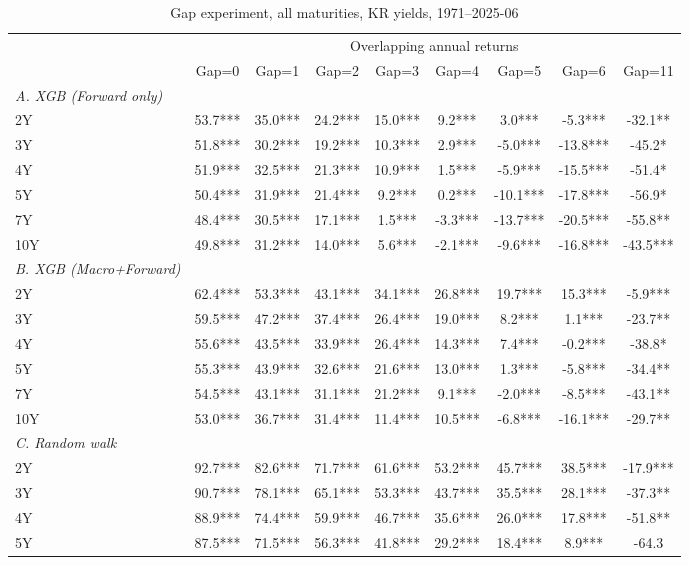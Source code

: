 \begin{table}[ht]
\centering
\small
\caption{Gap experiment, all maturities, KR yields, 1971–2025-06}
\label{tab:gap_all_maturities}
\begin{tabular}{lcccccccc}
\toprule
 & \multicolumn{8}{c}{Overlapping annual returns} \\
\cmidrule(lr){2-9}
 & Gap=0 & Gap=1 & Gap=2 & Gap=3 & Gap=4 & Gap=5 & Gap=6 & Gap=11 \\
\midrule
\textit{A. XGB (Forward only)} \\
2Y & 53.7*** & 35.0*** & 24.2*** & 15.0*** & 9.2*** & 3.0*** & -5.3*** & -32.1** \\
3Y & 51.8*** & 30.2*** & 19.2*** & 10.3*** & 2.9*** & -5.0*** & -13.8*** & -45.2* \\
4Y & 51.9*** & 32.5*** & 21.3*** & 10.9*** & 1.5*** & -5.9*** & -15.5*** & -51.4* \\
5Y & 50.4*** & 31.9*** & 21.4*** & 9.2*** & 0.2*** & -10.1*** & -17.8*** & -56.9* \\
7Y & 48.4*** & 30.5*** & 17.1*** & 1.5*** & -3.3*** & -13.7*** & -20.5*** & -55.8** \\
10Y & 49.8*** & 31.2*** & 14.0*** & 5.6*** & -2.1*** & -9.6*** & -16.8*** & -43.5*** \\
\midrule
\textit{B. XGB (Macro+Forward)} \\
2Y & 62.4*** & 53.3*** & 43.1*** & 34.1*** & 26.8*** & 19.7*** & 15.3*** & -5.9*** \\
3Y & 59.5*** & 47.2*** & 37.4*** & 26.4*** & 19.0*** & 8.2*** & 1.1*** & -23.7** \\
4Y & 55.6*** & 43.5*** & 33.9*** & 26.4*** & 14.3*** & 7.4*** & -0.2*** & -38.8* \\
5Y & 55.3*** & 43.9*** & 32.6*** & 21.6*** & 13.0*** & 1.3*** & -5.8*** & -34.4** \\
7Y & 54.5*** & 43.1*** & 31.1*** & 21.2*** & 9.1*** & -2.0*** & -8.5*** & -43.1** \\
10Y & 53.0*** & 36.7*** & 31.4*** & 11.4*** & 10.5*** & -6.8*** & -16.1*** & -29.7** \\
\midrule
\textit{C. Random walk} \\
2Y & 92.7*** & 82.6*** & 71.7*** & 61.6*** & 53.2*** & 45.7*** & 38.5*** & -17.9*** \\
3Y & 90.7*** & 78.1*** & 65.1*** & 53.3*** & 43.7*** & 35.5*** & 28.1*** & -37.3** \\
4Y & 88.9*** & 74.4*** & 59.9*** & 46.7*** & 35.6*** & 26.0*** & 17.8*** & -51.8** \\
5Y & 87.5*** & 71.5*** & 56.3*** & 41.8*** & 29.2*** & 18.4*** & 8.9*** & -64.3 \\

\end{tabular}
\end{table}
